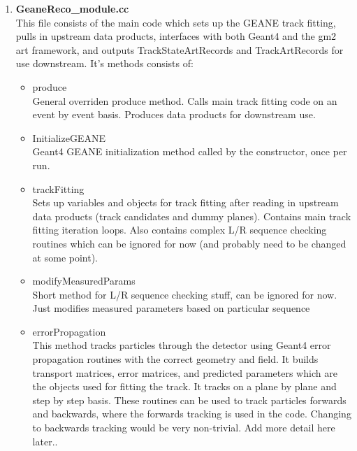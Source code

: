 \documentclass{article}
\begin{document}
    \begin{enumerate}

      \item{\bf{GeaneReco\_module.cc}} \\
      This file consists of the main code which sets up the GEANE track fitting, pulls in upstream data products, interfaces with both Geant4 and the gm2 art framework, and outputs TrackStateArtRecords and TrackArtRecords for use downstream. It's methods consists of:

        \begin{itemize}

          \item{produce} \\
          General overriden produce method. Calls main track fitting code on an event by event basis. Produces data products for downstream use.

          \item{InitializeGEANE} \\
          Geant4 GEANE initialization method called by the constructor, once per run.

          \item{trackFitting} \\ 
          Sets up variables and objects for track fitting after reading in upstream data products (track candidates and dummy planes). Contains main track fitting iteration loops. Also contains complex L/R sequence checking routines which can be ignored for now (and probably need to be changed at some point).

          \item{modifyMeasuredParams} \\ 
          Short method for L/R sequence checking stuff, can be ignored for now. Just modifies measured parameters based on particular sequence

          \item{errorPropagation} \\ 
          This method tracks particles through the detector using Geant4 error propagation routines with the correct geometry and field. It builds transport matrices, error matrices, and predicted parameters which are the objects used for fitting the track. It tracks on a plane by plane and step by step basis. These routines can be used to track particles forwards and backwards, where the forwards tracking is used in the code. Changing to backwards tracking would be very non-trivial. Add more detail here later..


\end{itemize}
\end{enumerate}
\end{document}

